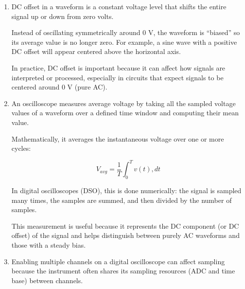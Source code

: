 \documentclass[../main.tex]{subfiles}
\begin{document}
\begin{enumerate}[label=\textbf{\arabic*.}]
	Operators may use instruments slightly differently (reading resolution, alignment, trigger settings, or probe placement), and they may also interpret measurement points differently (for example, where exactly a waveform crosses 10\% or 90\%). Small variations in technique, timing, or judgment can lead to different readings.

	In addition, measurement systems always have uncertainty, so even with correct procedure, results can vary slightly. This is why standardized procedures and calibration are essential to reduce operator-to-operator variation.

	
	\item DC offset in a waveform is a constant voltage level that shifts the entire signal up or down from zero volts.

	Instead of oscillating symmetrically around 0 V, the waveform is “biased” so its average value is no longer zero. For example, a sine wave with a positive DC offset will appear centered above the horizontal axis.

	In practice, DC offset is important because it can affect how signals are interpreted or processed, especially in circuits that expect signals to be centered around 0 V (pure AC).

	
	
	\item An oscilloscope measures average voltage by taking all the sampled voltage values of a waveform over a defined time window and computing their mean value.

	Mathematically, it averages the instantaneous voltage over one or more cycles:
	
	\begin{equation}
		V_{avg} = \frac{1}{T} \int_0^T v(t),dt
	\end{equation}

	In digital oscilloscopes (DSO), this is done numerically: the signal is sampled many times, the samples are summed, and then divided by the number of samples.

	This measurement is useful because it represents the DC component (or DC offset) of the signal and helps distinguish between purely AC waveforms and those with a steady bias.

	
	
	\item Enabling multiple channels on a digital oscilloscope can affect sampling because the instrument often shares its sampling resources (ADC and time base) between channels.


\end{enumerate}
\end{document}

